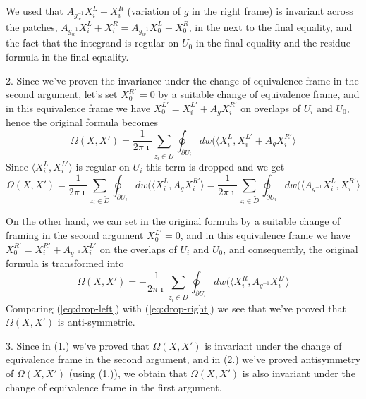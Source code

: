 \documentclass[11pt, oneside, reqno]{amsart}
\theoremstyle{definition} \newtheorem{definition}{Definition}[section]
\theoremstyle{definition} \newtheorem{remark}[definition]{Remark}
\theoremstyle{definition} \newtheorem{remarks}[definition]{Remarks}
\theoremstyle{definition} \newtheorem{question}[definition]{Question}
\theoremstyle{definition} \newtheorem*{note}{Note}
\theoremstyle{definition} \newtheorem{example}[definition]{Example}
\theoremstyle{definition} \newtheorem{examples}[definition]{Examples}
\begin{document}
We used that $A_{g_{w}^{-1}}  X_{i}^{L} + X_{i}^{R}$ (variation of $g$ in the right frame)
is invariant across the patches, $A_{g_{w}^{-1}}  X_{i}^{L} + X_{i}^{R} = A_{g_{w}^{-1}}  X_{0}^{L} + X_{0}^{R}$,
in the next to the final equality, and the fact that the integrand is regular on $U_0$ in the final equality
and the residue formula in the final equality. 

2. Since we've proven the invariance under the change of equivalence frame in the second argument,
let's set $X_{0}^{R'} = 0$ by a suitable change of equivalence frame,
and in this equivalence frame we have $X_{0}^{L'} = X_i^{L'} + A_{g} X_i^{R'}$
on overlaps of $U_i$ and $U_0$,  hence
the original formula becomes 
\begin{equation}
\Omega(X, X') =   \frac{1}{2 \pi \imath} \sum_{z_i \in \tilde D} \oint_{\partial U_i}  dw (
\langle  X^{L}_{i}, X_i^{L'} + A_{g} X_i^{R'} \rangle 
\end{equation}
Since $\langle X_i^{L}, X_{i}^{L'} \rangle $ is regular on $U_i$ this term is dropped and we get
\begin{equation}
\label{eq:drop-right}
  \Omega(X, X') =   \frac{1}{2 \pi \imath} \sum_{z_i \in \tilde D} \oint_{\partial U_i}  dw (
\langle  X^{L}_{i},  A_{g} X_i^{R'} \rangle  =  \frac{1}{2 \pi \imath} \sum_{z_i \in \tilde D} \oint_{\partial U_i}  dw (
\langle  A_{g^{-1}} X^{L}_{i},   X_i^{R'} \rangle 
\end{equation}

On the other hand, we can set in the original formula by a suitable change
of framing in the second argument $X_0^{L'} = 0$, and in this equivalence
frame we have $X_0^{R'} =  X_{i}^{R'}  + A_{g^{-1}} X_{i}^{L'}$ on the
overlaps of $U_i$ and $U_0$, and consequently, the original formula is transformed into
\begin{equation}
\label{eq:drop-left}
  \Omega(X, X') =   -\frac{1}{2 \pi \imath} \sum_{z_i \in \tilde D} \oint_{\partial U_i}  dw (
\langle  X^{R}_{i},  A_{g^{-1}} X_i^{L'} \rangle 
\end{equation}
Comparing (\ref{eq:drop-left}) with (\ref{eq:drop-right}) we see that we've proved that $\Omega(X,X')$ is anti-symmetric.


3. Since in (1.) we've proved that $\Omega(X,X')$ is invariant under
the change of equivalence frame in the second argument, and in (2.) we've proved
antisymmetry of $\Omega(X, X')$ (using (1.)), we obtain that $\Omega(X, X')$ is also
invariant under the change of equivalence frame in the first argument.
\end{document}
